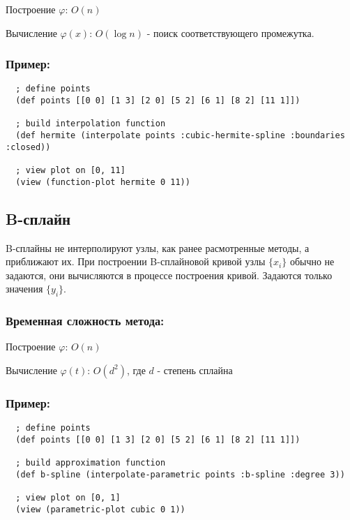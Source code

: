 Построение $\varphi$: $O(n)$

Вычисление $\varphi(x)$: $O(\log n)$ - поиск соответствующего промежутка.

\subsubsection{Пример:}

\begin{verbatim}
  ; define points
  (def points [[0 0] [1 3] [2 0] [5 2] [6 1] [8 2] [11 1]])

  ; build interpolation function
  (def hermite (interpolate points :cubic-hermite-spline :boundaries :closed))

  ; view plot on [0, 11]
  (view (function-plot hermite 0 11))
\end{verbatim}



\subsection{B-сплайн}

B-сплайны не интерполируют узлы, как ранее расмотренные методы, а приближают их. При построении B-сплайновой кривой узлы $\{x_i\}$ обычно не задаются, они вычисляются в процессе построения кривой. Задаются только значения $\{y_i\}$.

\subsubsection{Временная сложность метода:}

Построение $\varphi$: $O(n)$

Вычисление $\varphi(t)$: $O(d^2)$, где $d$ - степень сплайна


\subsubsection{Пример:}

\begin{verbatim}
  ; define points
  (def points [[0 0] [1 3] [2 0] [5 2] [6 1] [8 2] [11 1]])

  ; build approximation function
  (def b-spline (interpolate-parametric points :b-spline :degree 3))

  ; view plot on [0, 1]
  (view (parametric-plot cubic 0 1))
\end{verbatim}


